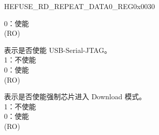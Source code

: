 \begin{register}{H}{EFUSE\_RD\_REPEAT\_DATA0\_REG}{0x0030}
\begin{regdesc}
\begin{reglist}
0：使能\\
(RO)
\label{fielddesc:EFUSEDISUSBSERIALJTAG}\item [EFUSE\_DIS\_USB\_SERIAL\_JTAG] 表示是否使能 USB-Serial-JTAG。\\
1：不使能\\
0：使能\\
(RO)
\label{fielddesc:EFUSEDISFORCEDOWNLOAD}\item [EFUSE\_DIS\_FORCE\_DOWNLOAD] 表示是否使能强制芯片进入 Download 模式。\\
1：不使能\\
0：使能\\
(RO)
\item [见下页……]
\end{reglist}\end{regdesc}
\end{register}
\addtocounter{Regfloat}{-1}
